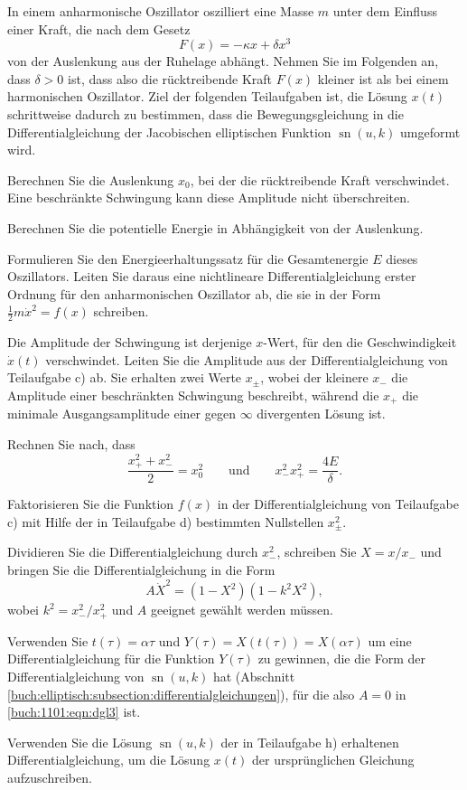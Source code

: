 \label{buch:elliptisch:aufgabe:1}
In einem anharmonische Oszillator oszilliert eine Masse $m$ unter dem
Einfluss einer Kraft, die nach dem Gesetz
\[
F(x) = -\kappa x + \delta x^3
\]
von der Auslenkung aus der Ruhelage abhängt.
Nehmen Sie im Folgenden an, dass $\delta >0$ ist,
dass also die rücktreibende Kraft $F(x)$ kleiner ist als bei einem
harmonischen Oszillator.
Ziel der folgenden Teilaufgaben ist, die Lösung $x(t)$ schrittweise
dadurch zu bestimmen, dass die Bewegungsgleichung in die Differentialgleichung
der Jacobischen elliptischen Funktion $\operatorname{sn}(u,k)$ umgeformt
wird.
\begin{teilaufgaben}
\item
Berechnen Sie die Auslenkung $x_0$, bei der die rücktreibende Kraft
verschwindet.
Eine beschränkte Schwingung kann diese Amplitude nicht überschreiten.
\item
Berechnen Sie die potentielle Energie in Abhängigkeit von der 
Auslenkung.
\item
\label{buch:1101:basic-dgl}
Formulieren Sie den Energieerhaltungssatz für die Gesamtenergie $E$
dieses Oszillators.
Leiten Sie daraus eine nichtlineare Differentialgleichung erster Ordnung
für den anharmonischen Oszillator ab, die sie in der Form
$\frac12m\dot{x}^2 = f(x)$ schreiben.
\item
Die Amplitude der Schwingung ist derjenige $x$-Wert, für den die
Geschwindigkeit $\dot{x}(t)$ verschwindet.
Leiten Sie die Amplitude aus der Differentialgleichung von
Teilaufgabe c)
ab.
Sie erhalten zwei Werte $x_{\pm}$, wobei der kleinere $x_-$
die Amplitude einer beschränkten Schwingung beschreibt,
während die $x_+$ die minimale Ausgangsamplitude einer gegen
$\infty$ divergenten Lösung ist.
\item
Rechnen Sie nach, dass
\[
\frac{x_+^2+x_-^2}{2}
=
x_0^2
\qquad\text{und}\qquad
x_-^2x_+^2
=
\frac{4E}{\delta}.
\]
\item
Faktorisieren Sie die Funktion $f(x)$ in der Differentialgleichung
von Teilaufgabe c) mit Hilfe der in Teilaufgabe d) bestimmten 
Nullstellen $x_{\pm}^2$.
\item
Dividieren Sie die Differentialgleichung durch $x_-^2$, schreiben
Sie $X=x/x_-$ und bringen Sie die Differentialgleichung in die
Form
\begin{equation}
A \dot{X}^2
=
(1-X^2)
(1-k^2X^2),
\label{buch:1101:eqn:dgl3}
\end{equation}
wobei $k^2=x_-^2/x_+^2$ und $A$ geeignet gewählt werden müssen.
\item
\label{buch:1101:teilaufgabe:dgl3}
Verwenden Sie $t(\tau) = \alpha\tau$
und
$Y(\tau)=X(t(\tau))=X(\alpha\tau)$ um eine Differentialgleichung für
die Funktion $Y(\tau)$ zu gewinnen, die die Form der Differentialgleichung
von $\operatorname{sn}(u,k)$ hat (Abschnitt 
\ref{buch:elliptisch:subsection:differentialgleichungen}),
für die also $A=0$ in \eqref{buch:1101:eqn:dgl3} ist.
\item
Verwenden Sie die Lösung $\operatorname{sn}(u,k)$ der in 
Teilaufgabe h)
erhaltenen Differentialgleichung,
um die Lösung $x(t)$ der ursprünglichen Gleichung aufzuschreiben.
\end{teilaufgaben}

